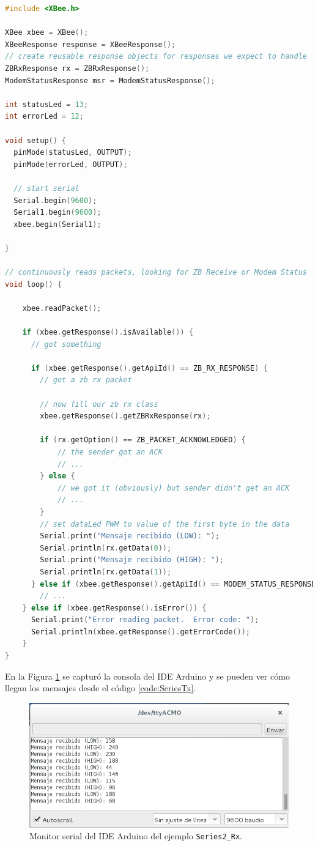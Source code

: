 \documentclass[11pt,oneside,spanish,a4paper]{article}
\begin{document}
\begin{lstlisting}[basicstyle=\ttfamily\small, language= C++,
  caption={Ejemplo \texttt{Series2\_Rx}},label=code:SeriesRx,
  frame=single]
#include <XBee.h>

XBee xbee = XBee();
XBeeResponse response = XBeeResponse();
// create reusable response objects for responses we expect to handle 
ZBRxResponse rx = ZBRxResponse();
ModemStatusResponse msr = ModemStatusResponse();

int statusLed = 13;
int errorLed = 12;

void setup() {
  pinMode(statusLed, OUTPUT);
  pinMode(errorLed, OUTPUT);
  
  // start serial
  Serial.begin(9600);
  Serial1.begin(9600);
  xbee.begin(Serial1);

}

// continuously reads packets, looking for ZB Receive or Modem Status
void loop() {
    
    xbee.readPacket();
    
    if (xbee.getResponse().isAvailable()) {
      // got something
      
      if (xbee.getResponse().getApiId() == ZB_RX_RESPONSE) {
        // got a zb rx packet
        
        // now fill our zb rx class
        xbee.getResponse().getZBRxResponse(rx);
            
        if (rx.getOption() == ZB_PACKET_ACKNOWLEDGED) {
            // the sender got an ACK
            // ...
        } else {
            // we got it (obviously) but sender didn't get an ACK
            // ...
        }
        // set dataLed PWM to value of the first byte in the data
        Serial.print("Mensaje recibido (LOW): ");
        Serial.println(rx.getData(0));
        Serial.print("Mensaje recibido (HIGH): ");
        Serial.println(rx.getData(1));
      } else if (xbee.getResponse().getApiId() == MODEM_STATUS_RESPONSE) {
        // ...
    } else if (xbee.getResponse().isError()) {
      Serial.print("Error reading packet.  Error code: ");  
      Serial.println(xbee.getResponse().getErrorCode());
    }
}
\end{lstlisting}  

En la Figura \ref{fig:SeriesRxConsola} se capturó la consola del IDE
Arduino y se pueden ver cómo llegan los mensajes desde el código
\ref{code:SeriesTx}.

\begin{figure}[h]
  \centering
  \includegraphics[width=.5\textwidth]{img/Series2RX-consola}
  \caption{Monitor serial del IDE Arduino del ejemplo
    \texttt{Series2\_Rx}.}
  \label{fig:SeriesRxConsola}
\end{figure}
\end{document}
